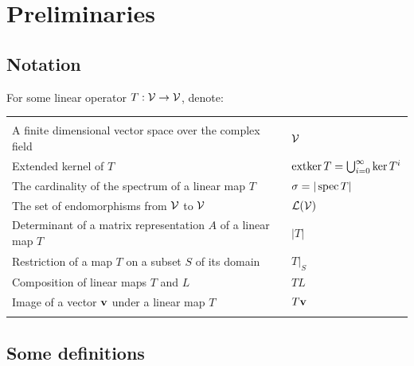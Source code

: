 \section{Preliminaries}
\subsection{Notation}

For some linear operator \(T: \mathcal{V} \to \mathcal{V}\), denote:

\noindent
\begin{center}
    \setlength{\tabcolsep}{12pt} 
    \begin{tabular}{|l|l|}
            \hline & \\
            A finite dimensional vector space over the complex field & \(\mathcal{V}\) \\[1ex]
            Extended kernel of \(T\)& \(\operatorname{extker} T = \bigcup_{i=0}^\infty \ker T ^i\)\\[1ex]
            The cardinality of the spectrum of a linear map $T$ & \(\sigma = |\operatorname{spec} T| \) \\  [1ex]
            The set of endomorphisms from \(\mathcal{V}\) to \( \mathcal{V}\) & \(\mathcal{L}(\mathcal{V}) \) \\[1ex]
            Determinant of a matrix representation $A$ of a linear map $T$ & \(|T|\)  \\[1ex]
            Restriction of a map \(T\) on a subset \(S\) of its domain & \(T|_S\) \\[1ex]
            Composition of linear maps \(T\) and \(L\) & \(TL\)\\[1ex]
            Image of a vector \(\mathbf{v}\) under a linear map \(T\) & \(T\mathbf{v}\)\\[1ex]
            & \\
            \hline 
        \end{tabular}
\end{center}    
   
    \subsection{Some definitions}


